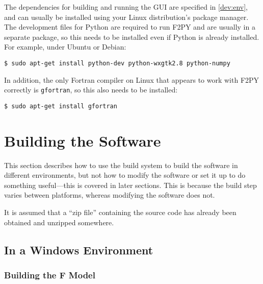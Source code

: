 The dependencies for building and running the GUI are specified in \ref{dev:env}, and can usually be 
installed using your Linux distribution's package manager.  The development files for Python are 
required to run F2PY and are usually in a separate package, so this needs to be installed even if 
Python is already installed.  For example, under Ubuntu or Debian:

\begin{lstlisting}
$ sudo apt-get install python-dev python-wxgtk2.8 python-numpy
\end{lstlisting}

In addition, the only Fortran compiler on Linux that appears to work with F2PY correctly is 
\verb|gfortran|, so this also needs to be installed:

\begin{lstlisting}
$ sudo apt-get install gfortran
\end{lstlisting}



\section{Building the Software}
\label{dev:build}

This section describes how to use the build system to build the software in different environments, 
but not how to modify the software or set it up to do something useful---this is covered in later 
sections.  This is because the build step varies between platforms, whereas modifying the software 
does not.

It is assumed that a ``zip file'' containing the source code has already been obtained and unzipped 
somewhere.

\subsection{In a Windows Environment}

\subsubsection{Building the F Model}

